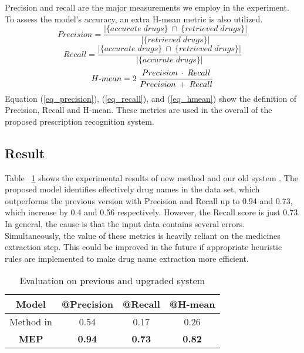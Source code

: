 Precision and recall are the major measurements we employ in the experiment. To assess the model's accuracy, an extra H-mean metric is also utilized. 
\begin{equation} \label{eq_precision}
   Precision = \frac{|\{accurate\;drugs\}\:\cap\:\{retrieved\;drugs\}|}{|\{retrieved\;drugs\}|}
\end{equation}
\begin{equation} \label{eq_recall}
   Recall = \frac{|\{accurate\;drugs\}\:\cap\:\{retrieved\;drugs\}|}{|\{accurate\;drugs\}|}
\end{equation}
\begin{equation} \label{eq_hmean}
   H{\text -}mean = 2\;\frac{Precision\:\cdot\:Recall}{Precision\:+\:Recall}
\end{equation}
Equation (\ref{eq_precision}), (\ref{eq_recall}), and (\ref{eq_hmean}) show the definition of Precision, Recall and H-mean. These metrics are used in the overall of the proposed prescription recognition system.
\subsection{Result}
Table ~\ref{tab1} shows the experimental results of new method and our old system \cite{nguyen2021developing}. The proposed model identifies effectively drug names in the data set, which outperforms the previous version with Precision and Recall up to 0.94 and 0.73, which increase by 0.4 and 0.56 respectively. However, the Recall score is just 0.73. In general, the cause is that the input data contains several errors. Simultaneously, the value of these metrics is heavily reliant on the medicines extraction step. This could be improved in the future if appropriate heuristic rules are implemented to make drug name extraction more efficient.

\begin{table}
\centering
\caption{Evaluation on previous and upgraded system}\label{tab1}
\begin{tabular}{|c|ccc|}
\hline
Model           & @Precision & @Recall & @H-mean  \\ 
\hline
Method in \cite{nguyen2021developing}      & 0.54       & 0.17    & 0.26     \\ 
\hline
\textbf{MEP} & \textbf{0.94}       & \textbf{0.73}    & \textbf{0.82}     \\
\hline
\end{tabular}
\end{table}


